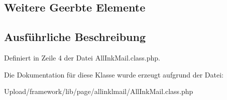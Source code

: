 \subsection*{Weitere Geerbte Elemente}


\subsection{Ausführliche Beschreibung}


Definiert in Zeile 4 der Datei All\+Ink\+Mail.\+class.\+php.



Die Dokumentation für diese Klasse wurde erzeugt aufgrund der Datei\+:\begin{DoxyCompactItemize}
\item 
Upload/framework/lib/page/allinklmail/All\+Ink\+Mail.\+class.\+php\end{DoxyCompactItemize}
